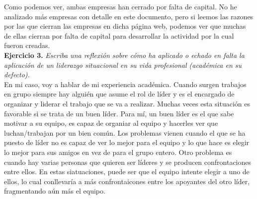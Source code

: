 \documentclass[12pt]{article}
\begin{document}
Como podemos ver, ambas empresas han cerrado por falta de capital. No he analizado más empresas con detalle en este documento, pero si leemos las razones por las que cierran las empresas en dicha página web, podemos ver que muchas de ellas cierran por falta de capital para desarrollar la actividad por la cual fueron creadas. \\

\textbf{Ejercicio 3.} \textit{Escriba una reflexión sobre cómo ha aplicado o echado en falta la aplicación de un liderazgo situacional en su vida profesional (académica en su defecto).} \\

En mi caso, voy a hablar de mi experiencia académica. Cuando surgen trabajos en grupo siempre hay alguién que asume el rol de líder y es el encargado de organizar y liderar el trabajo que se va a realizar. Muchas veces esta situación es favorable si se trata de un buen líder. Para mí, un buen líder es el que sabe motivar a su equipo, es capaz de organiar al equipo y hacerles ver que luchan/trabajan por un bien común. Los problemas vienen cuando el que se ha puesto de líder no es capaz de ver lo mejor para el equipo y lo que hace es elegir lo mejor para sus amigos en vez de para el grupo entero. Otro problema es cuando hay varias personas que quieren ser líderes y se producen confrontaciones entre ellos. En estas siatuaciones, puede ser que el equipo intente elegir a uno de ellos, lo cual conllevaría a más confrontaicones entre los apoyantes del otro líder, fragmentando aún más el equipo. 
\end{document}

